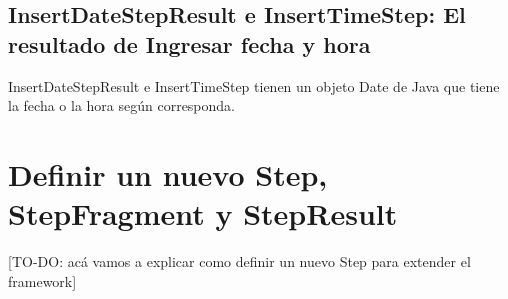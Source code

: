 \subsection{InsertDateStepResult e InsertTimeStep: El resultado de Ingresar fecha y hora}
InsertDateStepResult e InsertTimeStep tienen un objeto Date de Java que tiene la fecha o la hora según corresponda.






\section{Definir un nuevo Step, StepFragment y StepResult} \label{sec:definir_steps}
[TO-DO: acá vamos a explicar como definir un nuevo Step para extender el framework]



